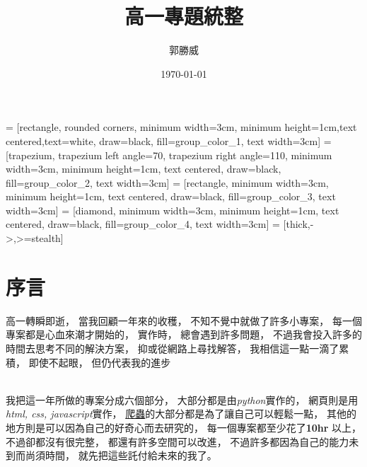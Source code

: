\documentclass[12pt]{ctexart}
\title{ 高一專題統整 }
\author{ 郭勝威 }
\date{ \today }
\begin{document}

 = [rectangle, rounded corners, minimum width=3cm, minimum height=1cm,text centered,text=white, draw=black, fill=group_color_1, text width=3cm]
 = [trapezium, trapezium left angle=70, trapezium right angle=110, minimum width=3cm, minimum height=1cm, text centered, draw=black, fill=group_color_2, text width=3cm]
 = [rectangle, minimum width=3cm, minimum height=1cm, text centered, draw=black, fill=group_color_3, text width=3cm]
 = [diamond, minimum width=3cm, minimum height=1cm, text centered, draw=black, fill=group_color_4, text width=3cm]
 = [thick,->,>=stealth]




\pagestyle{empty}
\maketitle

\thispagestyle{empty}


\clearpage
\tableofcontents

\pagestyle{plain}
\setcounter{page}{0}

\clearpage
\section{ 序言 }

高一轉瞬即逝， 
當我回顧一年來的收穫，
不知不覺中就做了許多小專案，
每一個專案都是心血來潮才開始的，
實作時，
總會遇到許多問題，
不過我會投入許多的時間去思考不同的解決方案，
抑或從網路上尋找解答，
我相信這一點一滴了累積，
即使不起眼，
但仍代表我的進步

\hspace*{\fill}\\

我把這一年所做的專案分成六個部分，
大部分都是由\textit{python}實作的，
網頁則是用\textit{html, css, javascript}實作，
\hyperref[sec::crawler]{爬蟲}的大部分都是為了讓自己可以輕鬆一點，
其他的地方則是可以因為自己的好奇心而去研究的，
每一個專案都至少花了\textbf{10hr} 以上，
不過卻都沒有很完整，
都還有許多空間可以改進，
不過許多都因為自己的能力未到而尚須時間，
就先把這些託付給未來的我了。
\end{document}
